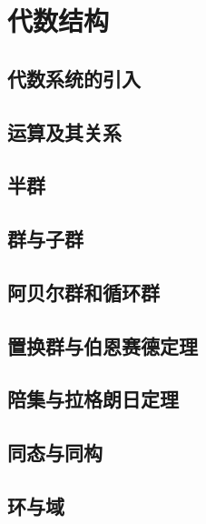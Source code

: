 \section{代数结构}

\subsection{代数系统的引入}

\subsection{运算及其关系}

\subsection{半群}

\subsection{群与子群}

\subsection{阿贝尔群和循环群}

\subsection{置换群与伯恩赛德定理}

\subsection{陪集与拉格朗日定理}

\subsection{同态与同构}

\subsection{环与域}